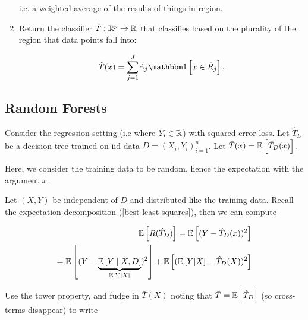\documentclass[11pt]{scrartcl}
\begin{document}
\begin{definition}
\begin{enumerate}
i.e. a weighted average of the results of things in region.

\item Return the classifier $\hat{T} : \mathbb R^p \rightarrow \mathbb R$ that classifies based on the plurality of the region that data points fall into:

\begin{equation}
    \hat{T}(x) = \sum_{j=1}^J \hat{\gamma}_j \one{x \in \hat{R}_j}.
\end{equation}

\end{enumerate}
\end{definition}





\subsection{Random Forests}

Consider the regression setting (i.e where $Y_i \in \mathbb R$) with squared error loss. Let $\hat{T}_D$ be a decision tree trained on iid data $D = (X_i, Y_i)_{i=1}^n$. Let $\bar{T}(x) = \mathbb{E} \left[ \hat{T}_D(x) \right]$.

\begin{remark}
Here, we consider the training data to be random, hence the expectation with the argument $x$.
\end{remark}

Let $(X,Y)$ be independent of $D$ and distributed like the training data. Recall the expectation decomposition (\ref{best least squares}), then we can compute

\begin{align}
    \mathbb{E} \left[ R(\hat{T}_D) \right] = \mathbb{E} \left[  (Y - \hat{T}_D(x))^2  \right] \\
    = \mathbb{E} \left[ (Y- \underbrace{\mathbb{E} \left[ Y \mid X, D \right]}_
    {\mathbb{E} \left[ Y|X \right]})^2 \right] + \mathbb{E} \left[  (\mathbb{E} \left[ Y|X \right] - \hat{T}_D(X))^2  \right] 
\end{align}

Use the tower property, and fudge in $\bar{T}(X)$ noting that $\bar{T} = \mathbb{E} \left[ \hat{T}_D \right]$ (so cross-terms disappear) to write
\end{document}
